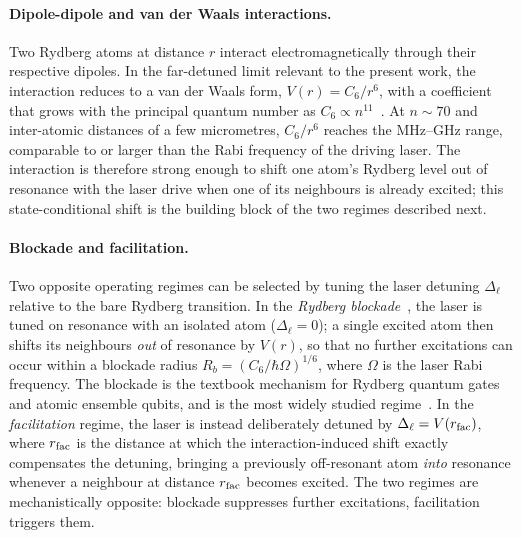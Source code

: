 \paragraph{Dipole-dipole and van der Waals interactions.}
Two Rydberg atoms at distance $r$ interact electromagnetically through
their respective dipoles. In the far-detuned limit relevant to the
present work, the interaction reduces to a van der Waals form,
$V(r) = C_6/r^{6}$, with a coefficient that grows with the principal
quantum number as $C_6 \propto n^{11}$~\cite{saffman2010quantum}. At
$n \sim 70$ and inter-atomic distances of a few micrometres, $C_6/r^{6}$
reaches the MHz--GHz range, comparable to or larger than the Rabi
frequency of the driving laser. The interaction is therefore strong
enough to shift one atom's Rydberg level out of resonance with the
laser drive when one of its neighbours is already excited; this
state-conditional shift is the building block of the two regimes
described next.

\paragraph{Blockade and facilitation.}
Two opposite operating regimes can be selected by tuning the laser
detuning $\Delta_\ell$ relative to the bare Rydberg transition. In the
\emph{Rydberg blockade}~\cite{saffman2010quantum}, the laser is tuned
on resonance with an isolated atom ($\Delta_\ell = 0$); a single excited
atom then shifts its neighbours \emph{out} of resonance by $V(r)$, so
that no further excitations can occur within a blockade radius
$R_b = (C_6/\hbar\Omega)^{1/6}$, where $\Omega$ is the laser Rabi
frequency. The blockade is the textbook mechanism for Rydberg quantum
gates and atomic ensemble qubits, and is the most widely studied
regime~\cite{saffman2010quantum, ravets2014coherent}. In the
\emph{facilitation} regime, the laser is instead deliberately detuned
by $\Delta_\ell = V(r_{\rm fac})$, where $r_{\rm fac}$ is the
distance at which the interaction-induced shift exactly compensates
the detuning, bringing a previously off-resonant atom \emph{into}
resonance whenever a neighbour at distance $r_{\rm fac}$ becomes
excited. The two regimes are mechanistically opposite: blockade
suppresses further excitations, facilitation triggers them.

